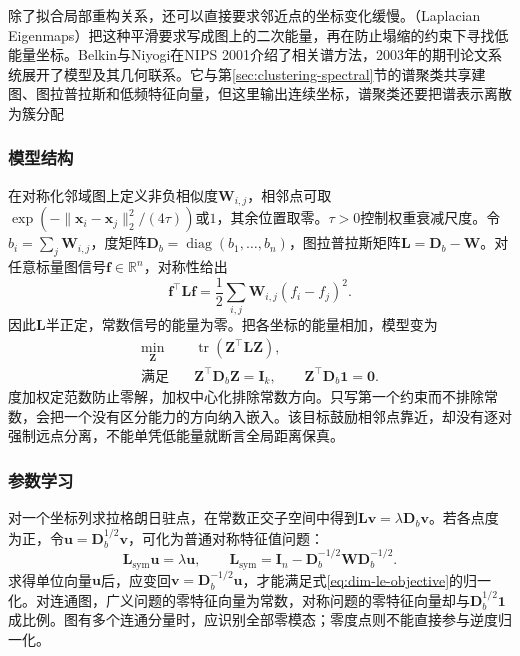 除了拟合局部重构关系，还可以直接要求邻近点的坐标变化缓慢。（Laplacian Eigenmaps）把这种平滑要求写成图上的二次能量，再在防止塌缩的约束下寻找低能量坐标。Belkin与Niyogi在NIPS 2001介绍了相关谱方法，2003年的期刊论文系统展开了模型及其几何联系。它与第\ref{sec:clustering-spectral}节的谱聚类共享建图、图拉普拉斯和低频特征向量，但这里输出连续坐标，谱聚类还要把谱表示离散为簇分配

\subsubsection{模型结构}

在对称化邻域图上定义非负相似度$\bm{W}_{i,j}$，相邻点可取$\exp(-\lVert\bm{x}_i-\bm{x}_j\rVert_2^2/(4\tau))$或$1$，其余位置取零。$\tau>0$控制权重衰减尺度。令$b_i=\sum_j\bm{W}_{i,j}$，度矩阵$\bm{D}_b=\operatorname{diag}(b_1,\ldots,b_n)$，图拉普拉斯矩阵$\bm{L}=\bm{D}_b-\bm{W}$。对任意标量图信号$\bm{f}\in\mathbb{R}^n$，对称性给出
\begin{equation}
  \label{eq:dim-le-energy}
  \bm{f}^{\top}\bm{L}\bm{f}
  =\frac12\sum_{i,j}\bm{W}_{i,j}(f_i-f_j)^2.
\end{equation}
因此$\bm{L}$半正定，常数信号的能量为零。把各坐标的能量相加，模型变为
\begin{equation}
  \label{eq:dim-le-objective}
  \begin{aligned}
    \min_{\bm{Z}}\quad&
      \operatorname{tr}(\bm{Z}^{\top}\bm{L}\bm{Z}),\\
    \text{满足}\quad&
      \bm{Z}^{\top}\bm{D}_b\bm{Z}=\bm{I}_k,\qquad
      \bm{Z}^{\top}\bm{D}_b\bm{1}=\bm{0}.
  \end{aligned}
\end{equation}
度加权定范数防止零解，加权中心化排除常数方向。只写第一个约束而不排除常数，会把一个没有区分能力的方向纳入嵌入。该目标鼓励相邻点靠近，却没有逐对强制远点分离，不能单凭低能量就断言全局距离保真。

\subsubsection{参数学习}

对一个坐标列求拉格朗日驻点，在常数正交子空间中得到$\bm{L}\bm{v}=\lambda\bm{D}_b\bm{v}$。若各点度为正，令$\bm{u}=\bm{D}_b^{1/2}\bm{v}$，可化为普通对称特征值问题：
\[
  \bm{L}_{\mathrm{sym}}\bm{u}=\lambda\bm{u},
  \qquad
  \bm{L}_{\mathrm{sym}}
  =\bm{I}_n-\bm{D}_b^{-1/2}\bm{W}\bm{D}_b^{-1/2}.
\]
求得单位向量$\bm{u}$后，应变回$\bm{v}=\bm{D}_b^{-1/2}\bm{u}$，才能满足式\eqref{eq:dim-le-objective}的归一化。对连通图，广义问题的零特征向量为常数，对称问题的零特征向量却与$\bm{D}_b^{1/2}\bm{1}$成比例。图有多个连通分量时，应识别全部零模态；零度点则不能直接参与逆度归一化。

